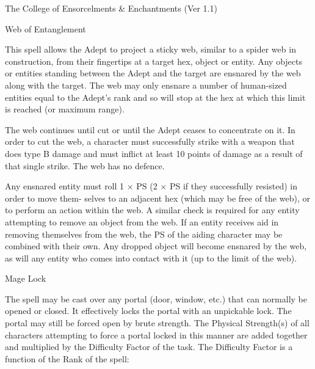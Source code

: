 \begin{Chapter}{The College of Ensorcelments \& Enchantments (Ver 1.1)}
\begin{spell}[S-5]{Web of Entanglement }

\begin{effects}
This spell allows the Adept to project a sticky web, similar to a
spider web in construction, from their fingertips at a target hex,
object or entity.  Any objects or entities standing between the Adept
and the target are ensnared by the web along with the target. The web
may only ensnare a number of human-sized entities equal to the Adept’s
rank and so will stop at the hex at which this limit is reached (or
maximum range).

The web continues until cut or until the Adept ceases to concentrate
on it. In order to cut the web, a character must successfully strike
with a weapon that does type B damage and must inflict at least 10
points of damage as a result of that single strike.  The web has no
defence.

Any ensnared entity must roll 1 × PS (2 × PS if they successfully
resisted) in order to move them- selves to an adjacent hex (which may
be free of the web), or to perform an action within the web.  A
similar check is required for any entity attempting to remove an
object from the web.  If an entity receives aid in removing themselves
from the web, the PS of the aiding character may be combined with
their own.  Any dropped object will become ensnared by the web, as
will any entity who comes into contact with it (up to the limit of the
web).
\end{effects}
\end{spell}

\begin{spell}[S-6]{Mage Lock }

\begin{effects}
The spell may be cast over any portal (door, window, etc.)  that can
normally be opened or closed.  It effectively locks the portal with an
unpickable lock.  The portal may still be forced open by brute
strength.  The Physical Strength(s) of all characters attempting to
force a portal locked in this manner are added together and multiplied
by the Difficulty Factor of the task.  The Difficulty Factor is a
function of the Rank of the spell:


\end{effects}
\end{spell}
\end{Chapter}
